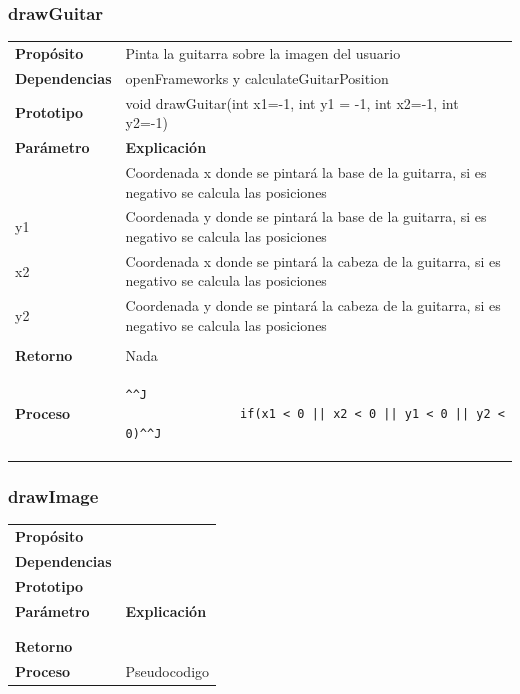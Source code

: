 \documentclass[a4paper,10pt]{article}
\begin{document}
\subsubsection{drawGuitar}
\begin{tabularx}{\textwidth}{p{25mm} X}
        \textbf{Propósito} & Pinta la guitarra sobre la imagen del usuario\\
        \textbf{Dependencias} & openFrameworks y calculateGuitarPosition\\
        \textbf{Prototipo} & void drawGuitar(int x1=-1, int y1 = -1, int x2=-1, int y2=-1)\\
        \textbf{Parámetro} & \textbf{Explicación} \\
        \begin{tabular}{p{2cm} l}
                x1 & Coordenada x donde se pintará la base de la guitarra, si es negativo se calcula las posiciones\\ 
                y1 & Coordenada y donde se pintará la base de la guitarra, si es negativo se calcula las posiciones\\ 
                x2 & Coordenada x donde se pintará la cabeza de la guitarra, si es negativo se calcula las posiciones\\ 
                y2 & Coordenada y donde se pintará la cabeza de la guitarra, si es negativo se calcula las posiciones\\ 
        \end{tabular}\\

        \textbf{Retorno} & Nada \\
        \textbf{Proceso} & 
        \begin{lstlisting}^^J
                if(x1 < 0 || x2 < 0 || y1 < 0 || y2 < 0)^^J
        \end{lstlisting}
\end{tabularx}
\subsubsection{drawImage}
\begin{tabularx}{\textwidth}{p{25mm} X}
        \textbf{Propósito} & \\
        \textbf{Dependencias} & \\
        \textbf{Prototipo} & \\
        \textbf{Parámetro} & \textbf{Explicación} \\
        \begin{tabular}{p{2cm} l}
                Parámetro 1 & \\
        \end{tabular}\\
        \textbf{Retorno} & \\
        \textbf{Proceso} & Pseudocodigo \\
\end{tabularx}
\end{document}
